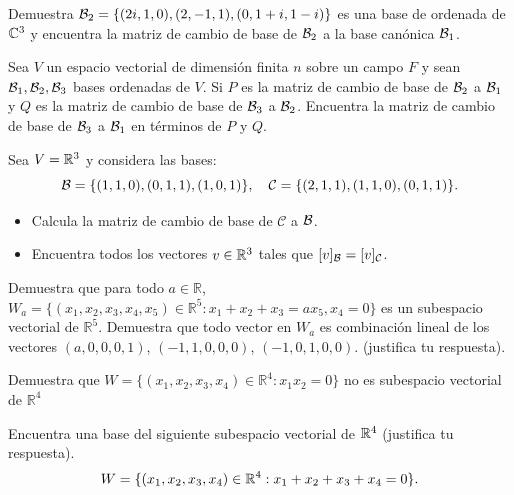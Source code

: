 \documentclass[12pt,a4paper]{book}
\newcommand{\llaves}[1]{\{#1\}}
\begin{document}
    \begin{ejercicio}
        Demuestra $\BB_{2} = \llaves{(2i, 1, 0), (2, -1, 1), (0, 1 + i, 1 - i)}$ es una base de ordenada de $\mathbb{C}^{3}$ y encuentra la matriz de cambio de base de $\mathcal{B}_{2}$ a la base canónica $\mathcal{B}_{1}$.
    \end{ejercicio}

    \begin{ejercicio}
        Sea $V$ un espacio vectorial de dimensión finita $n$ sobre un campo $F$ y sean $\mathcal{B}_{1}, \mathcal{B}_{2}, \mathcal{B}_{3}$ bases ordenadas de $V$. Si $P$ es la matriz de cambio de base de $\mathcal{B}_{2}$ a $\mathcal{B}_{1}$ y $Q$ es la matriz de cambio de base de $\mathcal{B}_{3}$ a $\mathcal{B}_{2}$. Encuentra la matriz de cambio de base de $\mathcal{B}_{3}$ a $\mathcal{B}_{1}$ en términos de $P$ y $Q$.
    \end{ejercicio}

    \begin{ejercicio}
        Sea $V = \mathbb{R}^{3}$ y considera las bases:
        \begin{equation*}
        \BB = \llaves{(1, 1, 0), (0, 1, 1), (1, 0, 1)}, \quad \mathcal{C} = \llaves{(2, 1, 1), (1, 1, 0), (0, 1, 1)}.
        \end{equation*}
        \begin{itemize}
            \item[(a)] Calcula la matriz de cambio de base de $\mathcal{C}$ a $\mathcal{B}$.
            \item[(b)] Encuentra todos los vectores $v \in \mathbb{R}^{3}$ tales que $[v]_{\mathcal{B}} = [v]_{\mathcal{C}}$.
        \end{itemize}
    \end{ejercicio}

    \begin{ejercicio}
        Demuestra que para todo $a\in\mathbb{R}$, $W_{a}=\{(x_{1},x_{2},x_{3},x_{4},x_{5})\in\mathbb{R}^{5}:x_{1}+x_{2}+x_{3}=ax_{5},x_{4}=0\}$
        es un subespacio vectorial de $\mathbb{R}^{5}$. Demuestra que todo
        vector en $W_{a}$ es combinación lineal de los vectores $(a,0,0,0,1)$,
        $(-1,1,0,0,0)$, $(-1,0,1,0,0)$. (justifica tu respuesta).
    \end{ejercicio}

    \begin{ejercicio}
        Demuestra que $W=\{(x_{1},x_{2},x_{3},x_{4})\in\mathbb{R}^{4}:x_{1}x_{2}=0\}$
        no es subespacio vectorial de $\mathbb{R}^{4}$
    \end{ejercicio}

    \begin{ejercicio}
        Encuentra una base del siguiente subespacio vectorial de $\mathbb{R}^{4}$
        (justifica tu respuesta).
        \begin{equation*}
            W=\{(x_{1},x_{2},x_{3},x_{4})\in\mathbb{R}^{4}:x_{1}+x_{2}+x_{3}+x_{4}=0\}.
        \end{equation*}
    \end{ejercicio}
    
\end{document}
